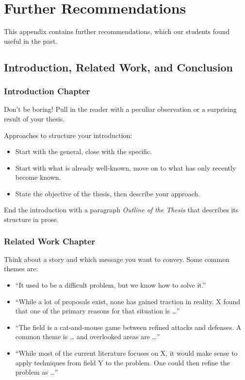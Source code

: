  
\chapter{Further Recommendations}

This appendix contains further recommendations, which our students found useful in the past.

\section{Introduction, Related Work, and Conclusion}

\subsection{Introduction Chapter}

Don’t be boring! Pull in the reader with a peculiar observation or a surprising result of your thesis.

Approaches to structure your introduction:
\begin{itemize}
\item Start with the general, close with the specific.
\item Start with what is already well-known, move on to what has only recently become known.
\item State the objective of the thesis, then describe your approach.
\end{itemize}

End the introduction with a paragraph \emph{Outline of the Thesis} that describes its structure in prose.

\subsection{Related Work Chapter}

Think about a story and which message you want to convey. Some common themes are:
\begin{itemize}
\item “It used to be a difficult problem, but we know how to solve it.”
\item “While a lot of proposals exist, none has gained traction in reality. X found that one of the primary reasons for that situation is …”
\item “The field is a cat-and-mouse game between refined attacks and defenses. A common theme is … and overlooked areas are …”
\item “While most of the current literature focuses on X, it would make sense to apply techniques from field Y to the problem. One could then refine the problem as …”
\end{itemize}

